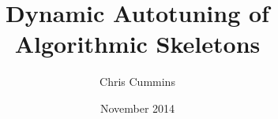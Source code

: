 \title{Dynamic Autotuning of Algorithmic Skeletons}
\author{Chris Cummins}
\date{November 2014}




\maketitle


